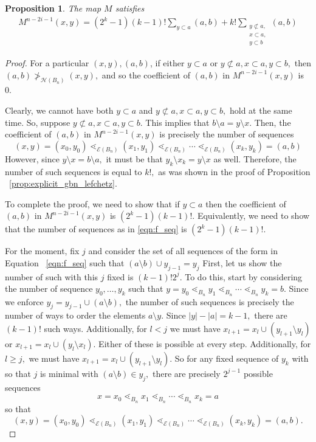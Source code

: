 \documentclass[10 pt]{amsart}
\theoremstyle{plain}
\newtheorem{prop}[thm]{Proposition}
\theoremstyle{definition}
\theoremstyle{remark}
\numberwithin{equation}{section}
\begin{document}
\begin{prop}
The map $M$ satisfies 
\begin{align*}
  M^{n-2i-1}(x, y) = (2^k - 1)(k-1)!\sum_{y \subset a}^{}(a, b) +k! \sum_{\substack{{y \not \subset a,}\\{x\subset a,}\\{y \subset b}}}^{}(a, b)
\end{align*}
\end{prop}
\begin{proof}

For a particular $(x, y),(a , b)$, if either $y \subset a$ or $y \not \subset a, x\subset a, y\subset b,$ then $(a, b) \not >_{ \mathcal H(B_n)} (x, y),$ and so the coefficient of $(a, b)$ in $M^{n-2i-1}(x, y)$ is 0.

Clearly, we cannot have both $y \subset a$ and $y \not \subset a, x\subset a, y\subset b,$ hold at the same time. So, suppose  $y \not \subset a, x\subset a, y\subset b.$ This implies that $b\setminus a = y\setminus x.$ Then, the coefficient of $(a, b)$ in $M^{n-2i-1}(x, y)$ is precisely the number of sequences 
\begin{equation}
\label{eqn:f_seq}
(x, y) = (x_0, y_0) \lessdot_{\mathcal E(B_n)} (x_1, y_1) \lessdot_{\mathcal E(B_n)}  \cdots \lessdot_{\mathcal E(B_n)}  (x_k, y_k) = (a, b)
\end{equation}
 However, since $y \setminus x = b\setminus a,$ it must be that $y_k \setminus x_k = y\setminus x$ as well. Therefore, the number of such sequences is equal to $k!,$ as was shown in the proof of Proposition ~\ref{prop:explicit_gbn_lefchetz}.

To complete the proof, we need to show that if $y \subset a$ then the coefficient of $(a, b)$ in $M^{n-2i-1}(x, y)$ is $(2^k - 1)(k-1)!$. Equivalently, we need to show that the number of sequences as in \eqref{eqn:f_seq}
is $(2^k - 1)(k-1)!.$

For the moment, fix $j$ and consider the set of all sequences of the form in Equation ~\eqref{eqn:f_seq} such that $(a\setminus b) \cup y_{j-1} = y_j$ First, let us show the number of such with this $j$ fixed is $(k-1)!2^j.$ To do this, start by considering the number of sequence $y_0,\ldots, y_k$ such that $y=y_0 \lessdot_{B_n} y_1 \lessdot_{B_n} \cdots \lessdot_{B_n} y_k = b.$ Since we enforce $y_j = y_{j-1} \cup (a \setminus b),$ the number of such sequences is precisely the number of ways to order the elements $a \setminus y.$ Since $|y| - |a| = k-1,$ there are $(k-1)!$ such ways. Additionally, for $l <j$ we must have $x_{l+1} = x_l \cup (y_{l+1} \setminus y_l)$ or $x_{l+1} = x_l \cup (y_l \setminus x_l).$ 
Either of these is possible at every step. Additionally, for $l \geq j,$ we must have $x_{l+1} = x_l \cup (y_{l+1} \setminus y_l).$ So for any fixed sequence of $y_k$ with so that $j$ is minimal with $(a\setminus b) \in y_j,$ 
there are precisely $2^{j-1}$ possible sequences 
$$x=x_0 \lessdot_{B_n} x_1 \lessdot_{B_n} \cdots \lessdot_{B_n} x_k = a$$
so that 
$$(x, y) = (x_0, y_0) \lessdot_{\mathcal E(B_n)} (x_1, y_1) \lessdot_{\mathcal E(B_n)}  \cdots \lessdot_{\mathcal E(B_n)}  (x_k, y_k) = (a, b).$$


\end{proof}
\end{document}
